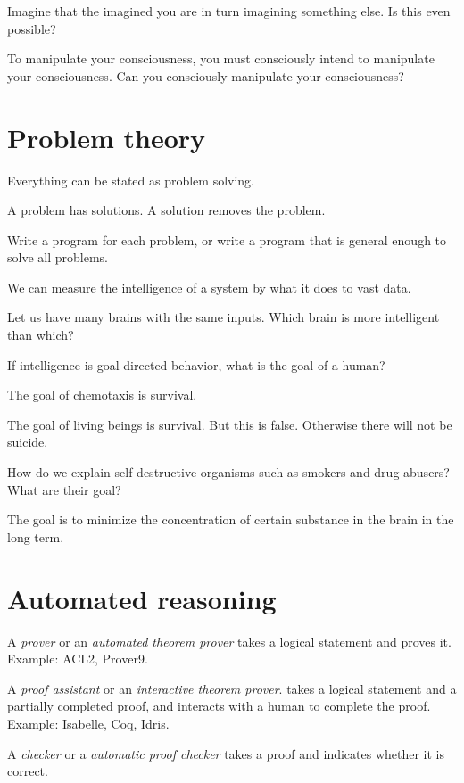 Imagine that the imagined you are in turn imagining something else.
Is this even possible?

To manipulate your consciousness,
you must consciously intend to manipulate your consciousness.
Can you consciously manipulate your consciousness?

\section{Problem theory}

Everything can be stated as problem solving.

A problem has solutions.
A solution removes the problem.

Write a program for each problem,
or write a program that is general enough to solve all problems.

We can measure the intelligence of a system by what it does to vast data.

Let us have many brains with the same inputs.
Which brain is more intelligent than which?

If intelligence is goal-directed behavior, what is the goal of a human?

The goal of chemotaxis is survival.

The goal of living beings is survival.
But this is false. Otherwise there will not be suicide.

How do we explain self-destructive organisms such as smokers and drug abusers?
What are their goal?

The goal is to minimize the concentration of certain substance in the brain in the long term.

\section{Automated reasoning}


A \emph{prover} or an \emph{automated theorem prover} takes a logical statement
and proves it.
Example: ACL2, Prover9.

A \emph{proof assistant}
or an \emph{interactive theorem prover}.
takes a logical statement and a partially completed proof,
and interacts with a human to complete the proof.
Example: Isabelle, Coq, Idris.

A \emph{checker} or a \emph{automatic proof checker} takes a proof and indicates whether it is correct.

